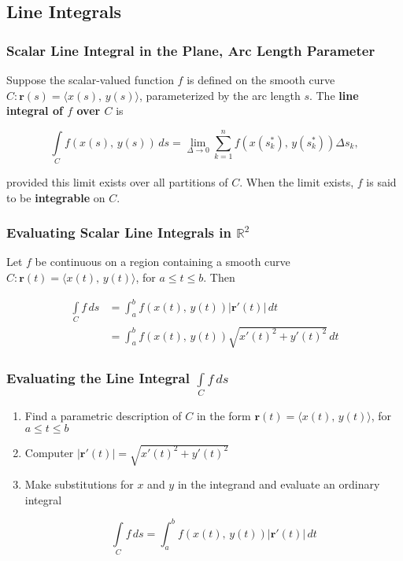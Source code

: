 \subsection{Line Integrals}
\subsubsection{Scalar Line Integral in the Plane, Arc Length Parameter}
Suppose the scalar-valued function $f$ is defined on the smooth curve $C: \mathbf{r}(s) = \langle x(s),\, y(s) \rangle$, parameterized by the arc length $s$. The \textbf{line integral of $f$ over $C$} is

\begin{equation}
    \int \limits _C f(x(s) ,\, y(s)) \, ds = \lim _{\Delta \rightarrow 0} \sum _{k = 1} ^{n} f(x(s_k ^*),\, y(s_k ^*)) \Delta s_k,
\end{equation}

provided this limit exists over all partitions of $C$. When the limit exists, $f$ is said to be \textbf{integrable} on $C$.

\subsubsection{Evaluating Scalar Line Integrals in $\mathbb{R}^2$}
Let $f$ be continuous on a region containing a smooth curve $C: \mathbf{r}(t) = \langle x(t),\, y(t) \rangle$, for $a \leq t \leq b$. Then

\begin{align}
    \int \limits _C f \, ds &= \int _a ^b f(x(t),\, y(t))|\mathbf{r}'(t)| \, dt \\
    &= \int _a ^b f(x(t),\, y(t))\sqrt{x'(t)^2 + y'(t)^2} \, dt
\end{align}

\subsubsection{Evaluating the Line Integral $\int \limits _C f \, ds$}
\begin{enumerate}
    \item Find a parametric description of $C$ in the form $\mathbf{r}(t) = \langle x(t),\, y(t) \rangle$, for $a \leq t \leq b$
    \item Computer $|\mathbf{r}'(t)| = \sqrt{x'(t)^2 + y'(t)^2}$
    \item Make substitutions for $x$ and $y$ in the integrand and evaluate an ordinary integral

    \begin{equation}
        \int \limits _C f \, ds = \int _a ^b f(x(t),\, y(t)) |\mathbf{r}'(t)| \, dt
    \end{equation}
\end{enumerate}

